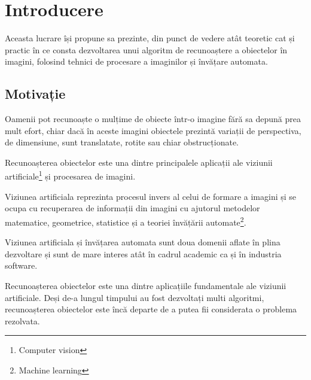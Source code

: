 \chapter{Introducere}

Aceasta lucrare își propune sa prezinte, din punct de vedere atât teoretic cat și practic în ce consta dezvoltarea unui algoritm de recunoaștere a obiectelor în imagini, folosind tehnici de procesare a imaginilor și învățare automata.



\section{Motivație}

Oamenii pot recunoaște o mulțime de obiecte într-o imagine fără sa depună prea mult efort, chiar dacă în aceste imagini obiectele prezintă variații de perspectiva, de dimensiune, sunt translatate, rotite sau chiar obstrucționate.

Recunoașterea obiectelor este una dintre principalele aplicații ale viziunii artificiale\footnote{Computer vision} și procesarea de imagini. 

Viziunea artificiala reprezinta procesul invers al celui de formare a imagini și se ocupa cu recuperarea de informații din imagini cu ajutorul metodelor matematice, geometrice, statistice și a teoriei învățării automate\footnote{Machine learning}.






Viziunea artificiala și învățarea automata sunt doua domenii aflate în plina dezvoltare și sunt de mare interes atât în cadrul academic ca și în industria software.

Recunoașterea obiectelor este una dintre aplicațiile fundamentale ale viziunii artificiale. Deși de-a lungul timpului au fost dezvoltați multi algoritmi, recunoașterea obiectelor este încă departe de a putea fii considerata o problema rezolvata.


